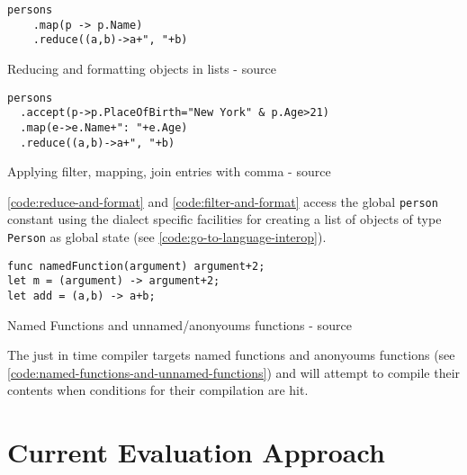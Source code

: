 \begin{listing}[H]
    \begin{verbatim}
persons
    .map(p -> p.Name)
    .reduce((a,b)->a+", "+b)
    \end{verbatim}
    \caption{Reducing and formatting objects in lists - source \cite{parser2_xnacly}}
    \label{code:reduce-and-format}
\end{listing}

\begin{listing}[H]
    \begin{verbatim}
persons
  .accept(p->p.PlaceOfBirth="New York" & p.Age>21)
  .map(e->e.Name+": "+e.Age)
  .reduce((a,b)->a+", "+b)
    \end{verbatim}
    \caption{Applying filter, mapping, join entries with comma - source \cite{parser2_xnacly}}
    \label{code:filter-and-format}
\end{listing}


\autoref{code:reduce-and-format} and \autoref{code:filter-and-format} access
the global \texttt{person} constant using the dialect specific facilities for
creating a list of objects of type \texttt{Person} as global state (see
\autoref{code:go-to-language-interop}).

\begin{listing}[H]
    \begin{verbatim}
func namedFunction(argument) argument+2;
let m = (argument) -> argument+2;
let add = (a,b) -> a+b;
    \end{verbatim}
    \caption{Named Functions and unnamed/anonyoums functions - source \cite{parser2_xnacly}}
    \label{code:named-functions-and-unnamed-functions}
\end{listing}


The just in time compiler targets named functions and anonyoums functions (see
\autoref{code:named-functions-and-unnamed-functions}) and will attempt to
compile their contents when conditions for their compilation are hit.


\section{Current Evaluation Approach}


